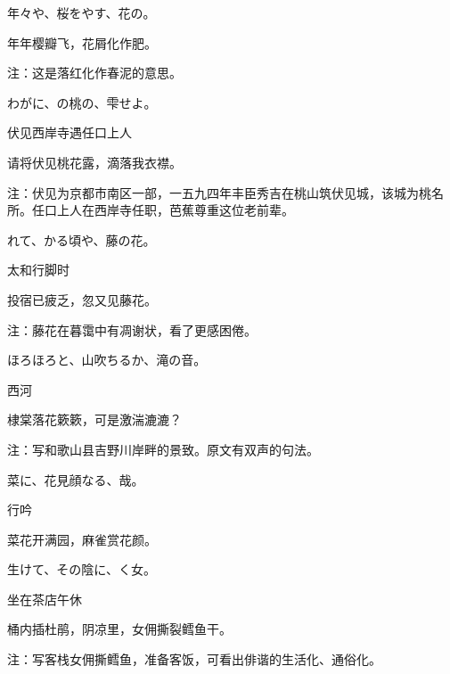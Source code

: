 \begin{haiku}
    {\FH 年々や、桜をやす、花の。}

    {\FK 年年樱瓣飞，花屑化作肥。}

    {\FT 注：这是落红化作春泥的意思。}
\end{haiku}

\begin{haiku}
    {\FH わがに、の桃の、雫せよ。}

    {\FK 伏见西岸寺遇任口上人}

    {\FK 请将伏见桃花露，滴落我衣襟。}

    {\FT 注：伏见为京都市南区一部，一五九四年丰臣秀吉在桃山筑伏见城，该城为桃名所。任口上人在西岸寺任职，芭蕉尊重这位老前辈。}
\end{haiku}

\begin{haiku}
    {\FH {}れて、かる頃や、藤の花。}

    {\FK 太和行脚时}

    {\FK 投宿已疲乏，忽又见藤花。}

    {\FT 注：藤花在暮霭中有凋谢状，看了更感困倦。}
\end{haiku}

\begin{haiku}
    {\FH ほろほろと、山吹ちるか、滝の音。}

    {\FK 西河}

    {\FK 棣棠落花簌簌，可是激湍漉漉？}

    {\FT 注：写和歌山县吉野川岸畔的景致。原文有双声的句法。}
\end{haiku}

\begin{haiku}
    {\FH 菜に、花見顔なる、哉。}

    {\FK 行吟}

    {\FK 菜花开满园，麻雀赏花颜。}
\end{haiku}

\begin{haiku}
    {\FH {}生けて、その陰に、く女。}

    {\FK 坐在茶店午休}

    {\FK 桶内插杜鹃，阴凉里，女佣撕裂鳕鱼干。}

    {\FT 注：写客栈女佣撕鳕鱼，准备客饭，可看出俳谐的生活化、通俗化。}
\end{haiku}

